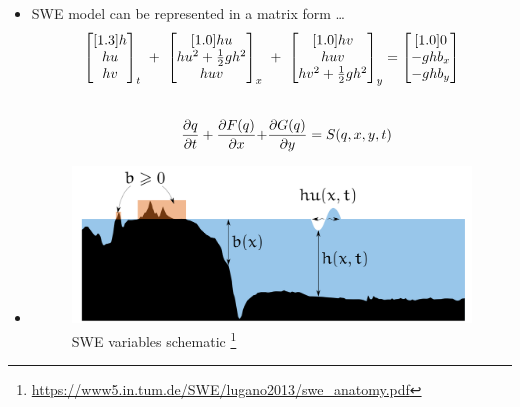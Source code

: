 \begin{frame}
\vspace{-2mm}
\begin{multicols}{2}
\begin{itemize}
\item[] SWE model can be represented in a matrix form \dots
\begin{align*}
\vspace{-15pt}
\begin{bmatrix}[1.3]
h\\
hu\\
hv\\
\end{bmatrix}_t \ + \ 
\begin{bmatrix}[1.0]
hu\\
hu^2 + \frac{1}{2}gh^2\\
huv\\
\end{bmatrix}_x\ &+ \ 
\begin{bmatrix}[1.0]
hv\\
huv\\
hv^2 + \frac{1}{2}gh^2\\
\end{bmatrix}_y = 
\begin{bmatrix}[1.0]
0\\
-ghb_x\\
-ghb_y
\end{bmatrix}\\[2em]
\frac{\partial q}{\partial t} + \dfrac{\partial F(q)}{\partial x} + &\frac{\partial G(q)}{\partial y} = S(q,x,y,t) 
\end{align*}
\vspace{5pt}
\item[]
\begin{figure}
\includegraphics[scale=0.2]{./Resources/Images/swe.png}%
\caption{SWE variables schematic \footnote{\url{https://www5.in.tum.de/SWE/lugano2013/swe_anatomy.pdf}}}
\label{fig:swechem}
\end{figure}
\end{itemize}


\end{multicols}
\end{frame}
